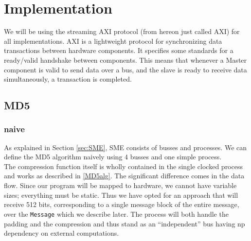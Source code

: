\documentclass[a4paper, openany]{book}
\begin{document}
\chapter{Implementation}
\label{sec:org54302fb}

We will be using the streaming AXI protocol (from hereon just called AXI) for all implementations. AXI is a lightweight protocol for synchronizing data transactions between hardware components. It specifies some standards for a ready/valid handshake between components. This means that whenever a Master component is valid to send data over a bus, and the slave is ready to receive data simultaneously, a transaction is completed.
\section{MD5}
\label{sec:orge4752e4}
\subsection{naive}
\label{MD5naive}
As explained in Section \ref{sec:SME}, SME consists of busses and processes. We can define the MD5 algorithm naively using 4 busses and one simple process.\\

The compression function itself is wholly contained in the single clocked process and works as described in \ref{MD5alg}. The significant difference comes in the data flow. Since our program will be mapped to hardware, we cannot have variable sizes; everything must be static. Thus we have opted for an approach that will receive 512 bits, corresponding to a single message block of the entire message, over the \texttt{Message} which we describe later. The process will both handle the padding and the compression and thus stand as an ``independent'' bus having np dependency on external computations.
\end{document}
